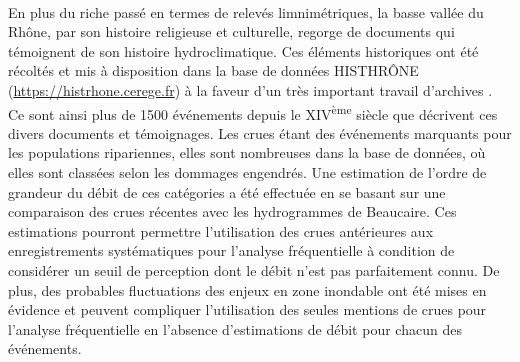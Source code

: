 	\paragraph{} En plus du riche passé en termes de relevés limnimétriques, la basse vallée du Rhône, par son histoire religieuse et culturelle, regorge de documents qui témoignent de son histoire hydroclimatique. Ces éléments historiques ont été récoltés et mis à disposition dans la base de données HISTHRÔNE (\url{https://histrhone.cerege.fr}) à la faveur d'un très important travail d'archives \citep{pichard_sept_2014}. Ce sont ainsi plus de 1500 événements depuis le XIV\textsuperscript{ème} siècle que décrivent ces divers documents et témoignages. Les crues étant des événements marquants pour les populations ripariennes, elles sont nombreuses dans la base de données, où elles sont classées selon les dommages engendrés. Une estimation de l'ordre de grandeur du débit de ces catégories a été effectuée en se basant sur une comparaison des crues récentes avec les hydrogrammes de Beaucaire. Ces estimations pourront permettre l'utilisation des crues antérieures aux enregistrements systématiques pour l'analyse fréquentielle à condition de considérer un seuil de perception dont le débit n'est pas parfaitement connu. De plus, des probables fluctuations des enjeux en zone inondable ont été mises en évidence et peuvent compliquer l'utilisation des seules mentions de crues pour l'analyse fréquentielle en l'absence d'estimations de débit pour chacun des événements. 


